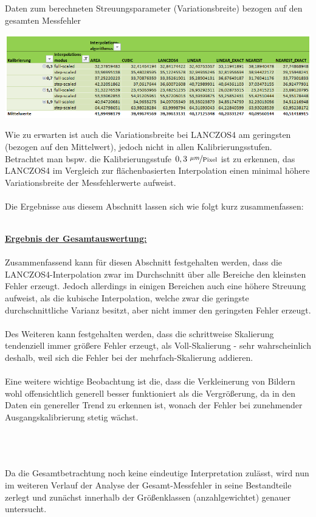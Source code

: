 \documentclass[
fontsize=10pt, 
listof = totoc,
parskip = half	
]{report}
\begin{document}
\begin{table}[H]
	\centering
	\caption{Daten zum berechneten Streuungsparameter (Variationsbreite) bezogen auf den gesamten Messfehler}
	\label{tab:DAGesamtStreu2Alle}
	\includegraphics[width=\textwidth, height=\textheight, keepaspectratio]{pics/Tab_DA_Gesamt_Streu2_Alle}
\end{table}


\noindent Wie zu erwarten ist auch die Variationsbreite bei LANCZOS4 am geringsten (bezogen auf den Mittelwert), jedoch nicht in allen Kalibrierungsstufen. Betrachtet man bspw. die Kalibrierungsstufe $0,3~\nicefrac{\mu m}{\text{Pixel}}$ ist zu erkennen, das LANCZOS4 im Vergleich zur flächenbasierten Interpolation einen minimal höhere Variationsbreite der Messfehlerwerte aufweist. 
\\\\
Die Ergebnisse aus diesem Abschnitt lassen sich wie folgt kurz zusammenfassen:
\\\\
\colorbox{gray!10}{
	\label{box:ErgebnisGesamtauswertung}
	\begin{minipage}{0.975\textwidth}
		\textbf{\underline{Ergebnis der Gesamtauswertung:}}\\\\
		Zusammenfassend kann für diesen Abschnitt festgehalten werden, dass die LANCZOS4-Interpolation zwar im Durchschnitt über alle Bereiche den kleinsten Fehler erzeugt. Jedoch allerdings in einigen Bereichen auch eine höhere Streuung aufweist, als die kubische Interpolation, welche zwar die geringste durchschnittliche Varianz besitzt, aber nicht immer den geringsten Fehler erzeugt.
		\\\\
		\noindent Des Weiteren kann festgehalten werden, dass die schrittweise Skalierung tendenziell immer größere Fehler erzeugt, als Voll-Skalierung - sehr wahrscheinlich deshalb, weil sich die Fehler bei der mehrfach-Skalierung addieren. 
		\\\\
		\noindent Eine weitere wichtige Beobachtung ist die, dass die Verkleinerung von Bildern wohl offensichtlich generell besser funktioniert als die Vergrößerung, da in den Daten ein genereller Trend zu erkennen ist, wonach der Fehler bei zunehmender Ausgangskalibrierung stetig wächst.
	\end{minipage}
}
\\\\\\
Da die Gesamtbetrachtung noch keine eindeutige Interpretation zulässt, wird nun im weiteren Verlauf der Analyse der Gesamt-Messfehler in seine Bestandteile zerlegt und zunächst innerhalb der Größenklassen (anzahlgewichtet) genauer untersucht.
\end{document}
